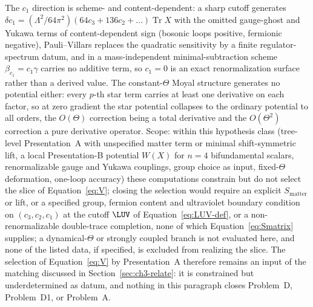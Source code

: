 The \(c_1\) direction is scheme- and content-dependent: a sharp cutoff generates \(\delta c_1=(\Lambda^2/64\pi^2)(64c_3+136c_2+\ldots)\operatorname{Tr}X\) with the omitted gauge-ghost and Yukawa terms of content-dependent sign (bosonic loops positive, fermionic negative), Pauli--Villars replaces the quadratic sensitivity by a finite regulator-spectrum datum, and in a mass-independent minimal-subtraction scheme \(\beta_{c_1}=c_1\gamma\) carries no additive term, so \(c_1=0\) is an exact renormalization surface rather than a derived value.
The constant-\(\Theta\) Moyal structure generates no potential either: every \(p\)-th star term carries at least one derivative on each factor, so at zero gradient the star potential collapses to the ordinary potential to all orders, the \(O(\Theta)\) correction being a total derivative and the \(O(\Theta^2)\) correction a pure derivative operator.
Scope: within this hypothesis class (tree-level Presentation~A with unspecified matter term or minimal shift-symmetric lift, a local Presentation-B potential \(W(X)\) for \(n=4\) bifundamental scalars, renormalizable gauge and Yukawa couplings, group choice as input, fixed-\(\Theta\) deformation, one-loop accuracy) these computations constrain but do not select the slice of Equation~\eqref{eq:V}; closing the selection would require an explicit \(S_{\mathrm{matter}}\) or lift, or a specified group, fermion content and ultraviolet boundary condition on \((c_3,c_2,c_1)\) at the cutoff \(\LUV\) of Equation~\eqref{eq:LUV-def}, or a non-renormalizable double-trace completion, none of which Equation~\eqref{eq:Smatrix} supplies; a dynamical-\(\Theta\) or strongly coupled branch is not evaluated here, and none of the listed data, if specified, is excluded from realizing the slice.
The selection of Equation~\eqref{eq:V} by Presentation~A therefore remains an input of the matching discussed in Section~\ref{sec:ch3-relate}: it is constrained but underdetermined as datum, and nothing in this paragraph closes Problem~D, Problem~D1, or Problem~A.
